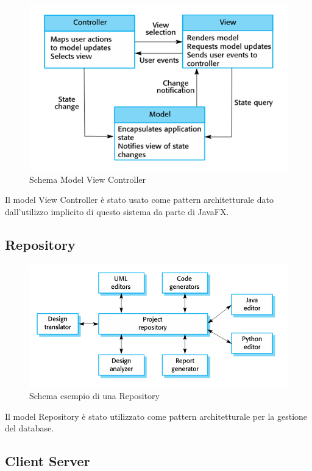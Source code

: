 \documentclass[12pt, a4paper]{report}
\begin{document}
\begin{figure}[h]
  \centering
  \includegraphics[width=\textwidth]{MVC.PNG}
  \caption{Schema Model View Controller}
\end{figure}

Il model View Controller è stato usato come pattern architetturale dato
dall'utilizzo implicito di questo sistema da parte di JavaFX.\@

\newpage

\subsection{Repository}

\begin{figure}[h]
  \centering
  \includegraphics[width=\textwidth]{Repository.PNG}
  \caption{Schema esempio di una Repository}
\end{figure}

Il model Repository è stato utilizzato come pattern architetturale per la
gestione del database. 

\subsection{Client Server}
\end{document}
